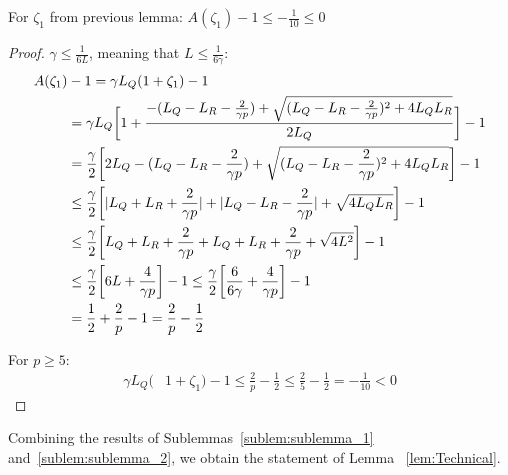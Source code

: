 \begin{sublemma}\label{sublem:sublemma_2}
    For $\zeta_1$ from previous lemma: $A(\zeta_1) - 1 \leq -\frac{1}{10} \leq 0$
\end{sublemma}
\begin{proof}
    $\gamma \leq \frac{1}{6 L}$, meaning that $L \leq \frac{1}{6 \gamma }$:
    \begin{align}
        A(\zeta_1)& - 1 = \gamma L_Q(1+\zeta_1) - 1 \\
        &= \gamma L_Q 
        \biggr[ 1 + \frac{-(L_Q - L_R - \frac{2}{\gamma p})+\sqrt{(L_Q - L_R -\frac{2}{\gamma p})^2 + 4 L_Q L_R}}{2L_Q}  \biggr] - 1\\
        &=
        \frac{\gamma}{2} 
        \biggr[ 2L_Q - (L_Q - L_R - \frac{2}{\gamma p}) + \sqrt{(L_Q - L_R - \frac{2}{\gamma p})^2 + 4 L_Q L_R}  \biggr] - 1\\ 
        & \leq
        \frac{\gamma}{2} 
        \biggr[ |L_Q + L_R + \frac{2}{\gamma p}| + |L_Q - L_R - \frac{2}{\gamma p}| + \sqrt{ 4 L_Q L_R}  \biggr] - 1\\
        & \leq
        \frac{\gamma}{2} 
        \biggr[ L_Q + L_R + \frac{2}{\gamma p} + L_Q + L_R + \frac{2}{\gamma p} + \sqrt{ 4 L^2}  \biggr] - 1\\
        & \leq
        \frac{\gamma}{2} 
        \biggr[ 6 L + \frac{4}{\gamma p}  \biggr] - 1
        \leq
        \frac{\gamma}{2} 
        \biggr[ \frac{6}{6 \gamma} + \frac{4}{\gamma p}  \biggr] - 1 \\
        &=
        \frac{1}{2} + \frac{2}{p} - 1
        = \frac{2}{p} - \frac{1}{2}
    \end{align}
    
    For $p \geq 5$:
    \begin{align}
         \gamma L_Q(&1+\zeta_1) - 1 \leq \frac{2}{p} - \frac{1}{2} \leq \frac{2}{5} - \frac{1}{2} 
         = -\frac{1}{10} < 0 \label{eq:St_6}
    \end{align}
\end{proof}

Combining the results of Sublemmas~\ref{sublem:sublemma_1} and~\ref{sublem:sublemma_2}, 
we obtain the statement of Lemma ~\ref{lem:Technical}.

